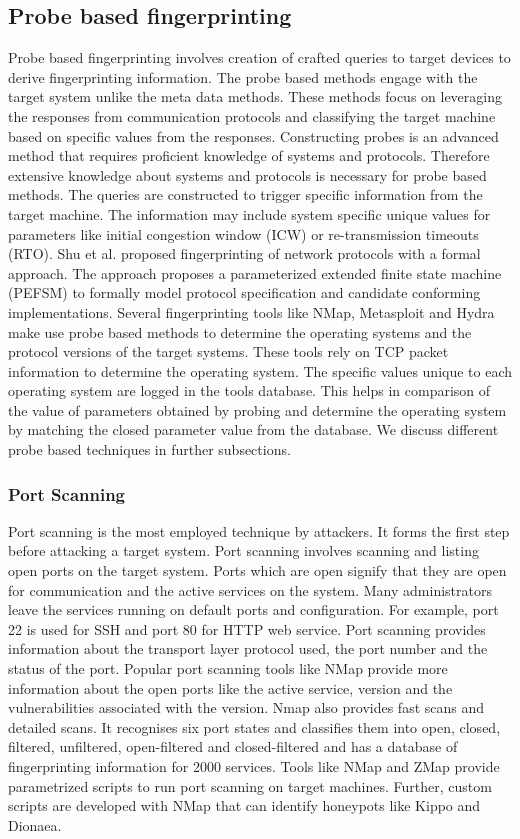 \documentclass[../main.tex]{subfiles}
\begin{document}
\subsection{Probe based fingerprinting}
Probe based fingerprinting involves creation of crafted queries to target devices to derive fingerprinting information. The probe based methods engage with  the target system unlike the meta data methods. These methods focus on leveraging the responses from communication protocols and classifying the target machine based on specific values from the responses. Constructing probes is an advanced method that requires proficient knowledge of systems and protocols. Therefore extensive knowledge about systems and protocols is necessary for probe based methods. The queries are constructed to trigger specific information from the target machine. The information may include system specific unique values for parameters like initial congestion window (ICW) or re-transmission timeouts (RTO). 
Shu et al.\cite{shu2006network} proposed fingerprinting of network protocols with a formal approach. The approach proposes a parameterized extended finite state machine (PEFSM) to formally model protocol specification and candidate conforming implementations. Several fingerprinting tools like NMap, Metasploit and Hydra make use probe based  methods to determine the operating systems and the protocol versions of the target systems. These tools rely on TCP packet information to determine the operating system. The specific values unique to each operating system are logged in  the tools database. This helps in comparison of the value of parameters obtained by probing and determine the operating system by matching the closed parameter value from the database. We discuss different probe based techniques in further subsections. 
\newline

\subsubsection{Port Scanning}
Port scanning is the most employed technique by attackers. It forms the first step before attacking a target system. Port scanning involves scanning and listing open ports on the target system. Ports which are open signify that they are open for communication and the active services on the system. Many administrators leave the services running on default ports and configuration. For example, port 22 is used for SSH and port 80 for HTTP web service. Port scanning provides information about the transport layer protocol used, the port number and the status of the port. Popular port scanning tools like NMap\cite{NMap} provide more information about the open ports like the active service, version and the vulnerabilities associated with the version. Nmap also provides fast scans and detailed scans. It recognises six port states and classifies them into open, closed, filtered, unfiltered, open-filtered and closed-filtered and has a database of fingerprinting information for 2000 services. 
Tools like NMap and ZMap \cite{zmap} provide parametrized scripts to run port scanning on target machines. Further, custom scripts are developed with NMap that can identify honeypots like Kippo and Dionaea.  
\newline
\end{document}
